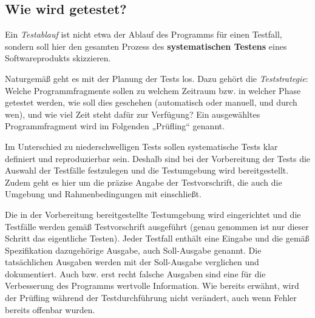\subsection{Wie wird getestet?}
\label{sec:Kap-11-1-3}

Ein \textit{Testablauf} 
ist nicht etwa der Ablauf des Programms für einen Testfall, sondern soll hier den gesamten Prozess des \textbf{systematischen Testens} eines Software\-produkts skizzieren.


Naturgemäß geht es mit der Planung der Tests los. Dazu gehört die \textit{Teststrategie}: 
Welche Programmfragmente sollen zu welchem Zeitraum bzw. in welcher Phase getestet werden, wie soll dies geschehen (automatisch oder manuell, und durch wen), und wie viel Zeit steht dafür zur Verfügung? Ein ausgewähltes Programmfragment wird im Folgenden „Prüfling“ genannt.
	

Im Unterschied zu niederschwelligen Tests 
sollen systematische Tests klar definiert und reproduzierbar sein. Deshalb sind bei der Vorbereitung der Tests die Auswahl der Testfälle festzulegen und die Testumgebung wird bereitgestellt. Zudem geht es hier um die präzise Angabe der Testvorschrift, die auch die Umgebung und Rahmen\-bedingungen mit einschließt.
	

Die in der Vorbereitung bereitgestellte Testumgebung wird eingerichtet 
und die Testfälle werden gemäß Testvorschrift ausgeführt (genau genommen ist nur dieser Schritt das eigentliche Testen). Jeder Testfall enthält eine Eingabe und die gemäß Spezifikation dazugehörige Ausgabe, auch Soll-Ausgabe genannt. Die tatsächlichen Ausgaben werden mit der Soll-Ausgabe verglichen und dokumentiert. Auch bzw. erst recht falsche Ausgaben sind eine für die Verbesserung des Programms wertvolle Information. Wie bereits erwähnt, wird der Prüfling während der Testdurchführung nicht verändert, auch wenn Fehler bereits offenbar wurden.
	

